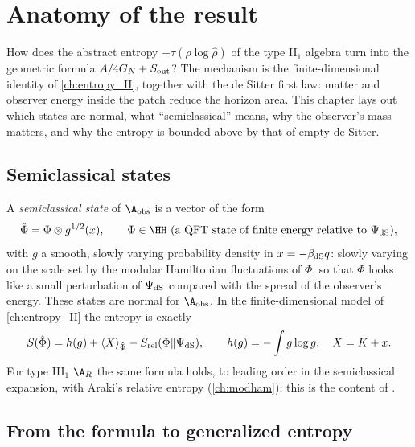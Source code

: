 \chapter{Anatomy of the result}\label{ch:anatomy}

\begin{physmotiv}
How does the abstract entropy $-\tau(\hat\rho\log\hat\rho)$ of the type II$_1$ algebra turn into the geometric formula $A/4G_N+S_{\rm out}$? The mechanism is the finite-dimensional identity of \cref{ch:entropy_II}, together with the de Sitter first law: matter and observer energy inside the patch reduce the horizon area. This chapter lays out which states are normal, what ``semiclassical'' means, why the observer's mass matters, and why the entropy is bounded above by that of empty de Sitter.
\end{physmotiv}

\section{Semiclassical states}

A \emph{semiclassical state} of $\A_{\rm obs}$ is a vector of the form
\begin{equation}
\hat\Phi=\Phi\otimes g^{1/2}(x),\qquad\Phi\in\HH\ \text{(a QFT state of finite energy relative to }\Psi_{\rm dS}),
\end{equation}
with $g$ a smooth, slowly varying probability density in $x=-\beta_{\rm dS}q$: slowly varying on the scale set by the modular Hamiltonian fluctuations of $\Phi$, so that $\Phi$ looks like a small perturbation of $\Psi_{\rm dS}$ compared with the spread of the observer's energy. These states are normal for $\A_{\rm obs}$. In the finite-dimensional model of \cref{ch:entropy_II} the entropy is exactly
\begin{equation}
S(\hat\Phi)=h(g)+\langle X\rangle_{\hat\Phi}-S_{\rm rel}(\Phi\|\Psi_{\rm dS}),\qquad h(g)=-\int g\log g,\quad X=K+x.
\end{equation}
For type III$_1$ $\A_R$ the same formula holds, to leading order in the semiclassical expansion, with Araki's relative entropy (\cref{ch:modham}); this is the content of \cite{CLPW2023}.

\section{From the formula to generalized entropy}

